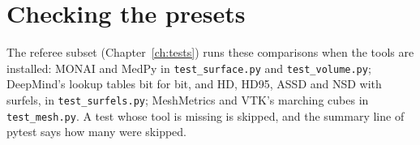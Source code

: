 \section{Checking the presets}\label{tools:checking}

The referee subset (Chapter~\ref{ch:tests}) runs these comparisons when the tools are installed:
MONAI and MedPy in \texttt{test\_surface.py} and \texttt{test\_volume.py}; DeepMind's lookup
tables bit for bit, and HD, HD95, ASSD and NSD with surfels, in \texttt{test\_surfels.py};
MeshMetrics and VTK's marching cubes in \texttt{test\_mesh.py}. A test whose tool is missing is
skipped, and the summary line of pytest says how many were skipped.
